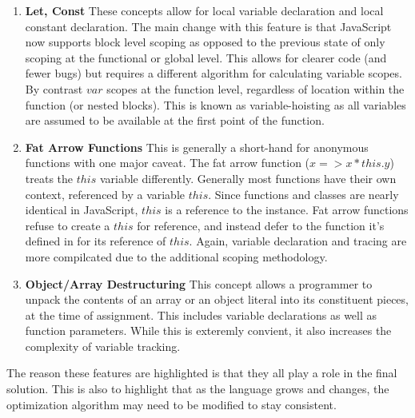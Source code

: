   \begin{enumerate}
    \item \textbf{Let, Const} These concepts allow for local variable declaration and local constant declaration.  The main change with this feature is that JavaScript now supports block level scoping as opposed to the previous state of only scoping at the functional or global level.  This allows for clearer code (and fewer bugs) but requires a different algorithm for calculating variable scopes.  By contrast $var$ scopes at the function level, regardless of location within the function (or nested blocks).  This is known as variable-hoisting as all variables are assumed to be available at the first point of the function.
    \item \textbf{Fat Arrow Functions} This is generally a short-hand for anonymous functions with one major caveat.  The fat arrow function ($x => x * this.y$) treats the $this$ variable differently.  Generally most functions have their own context, referenced by a variable $this$.  Since functions and classes are nearly identical in JavaScript, $this$ is a reference to the instance.  Fat arrow functions refuse to create a $this$ for reference, and instead defer to the function it's defined in for its reference of $this$. Again, variable declaration and tracing are more compilcated due to the additional scoping methodology.
    \item \textbf{Object/Array Destructuring}  This concept allows a programmer to unpack the contents of an array or an object literal into its constituent pieces, at the time of assignment.  This includes variable declarations as well as function parameters.  While this is exteremly convient, it also increases the complexity of variable tracking.  
  \end{enumerate}

The reason these features are highlighted is that they all play a role in the final solution.  This is also to highlight that as the language grows and changes, the optimization algorithm may need to be modified to stay consistent. 
